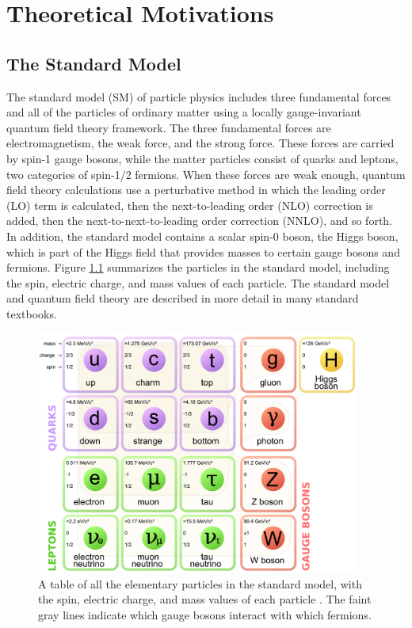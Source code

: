 \chapter{Theoretical Motivations
\label{ch:theory}}


\section{The Standard Model}

The standard model (SM) of particle physics includes three fundamental forces and all of the particles of ordinary matter using a locally gauge-invariant quantum field theory framework. The three fundamental forces are electromagnetism, the weak force, and the strong force. These forces are carried by spin-1 gauge bosons, while the matter particles consist of quarks and leptons, two categories of spin-1/2 fermions. When these forces are weak enough, quantum field theory calculations use a perturbative method in which the leading order (LO) term is calculated, then the next-to-leading order (NLO) correction is added, then the next-to-next-to-leading order correction (NNLO), and so forth. In addition, the standard model contains a scalar spin-0 boson, the Higgs boson, which is part of the Higgs field that provides masses to certain gauge bosons and fermions. Figure \ref{fig:sm-particles} summarizes the particles in the standard model, including the spin, electric charge, and mass values of each particle. The standard model and quantum field theory are described in more detail in many standard textbooks.

\begin{figure}[hbt]
\begin{center}
\includegraphics[width=0.95\textwidth]{figures/Standard_Model_of_Elementary_Particles.pdf}
\caption{A table of all the elementary particles in the standard model, with the spin, electric charge, and mass values of each particle \cite{MissMJ}. The faint gray lines indicate which gauge bosons interact with which fermions.}
\label{fig:sm-particles}
\end{center}
\end{figure}


